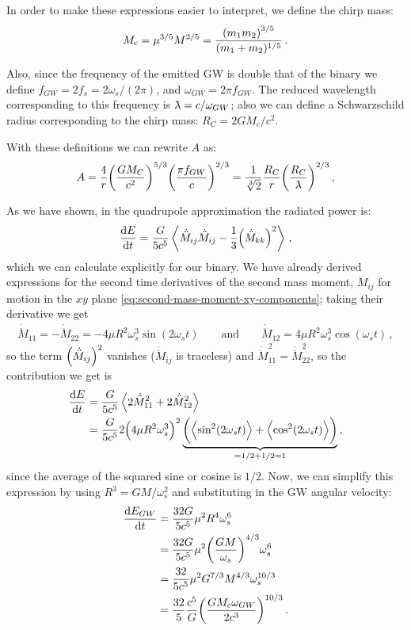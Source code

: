 \documentclass[main.tex]{subfiles}
\begin{document}
In order to make these expressions easier to interpret, we define the chirp mass: 
%
\begin{align}
M_c = \mu ^{3/5} M^{2/5} = \frac{\qty(m_1 m_2 )^{3/5}}{(m_1 + m_2 )^{1/5}}
\,.
\end{align}

Also, since the frequency of the emitted GW is double that of the binary we define \(f_{GW} = 2 f_s = 2 \omega_{s} / (2 \pi )\), and \(\omega_{GW} = 2 \pi f_{GW}\).
The reduced wavelength corresponding to this frequency is \(\lambdabar = c / \omega_{GW}\); also we can define a Schwarzschild radius corresponding to the chirp mass: \(R_C = 2GM_c / c^2\). 

With these definitions we can rewrite \(A\) as: 
%
\begin{align}
A = \frac{4}{r} \qty( \frac{G M_C}{c^2})^{5/3} \qty( \frac{\pi f_{GW}}{c})^{2/3}
= \frac{1}{\sqrt[3]{2}} \frac{R_C}{r} \qty( \frac{R_C}{\lambdabar})^{2/3}
\,,
\end{align}

As we have shown, in the quadrupole approximation the radiated power is: 
%
\begin{align}
\dv{E}{t} = \frac{G}{5 c^{5}} \expval{\dot{\ddot{M}}_{ij} \dot{\ddot{M}}_{ij} - \frac{1}{3} \qty(\dot{\ddot{M}}_{kk})^2}
\,,
\end{align}
%
which we can calculate explicitly for our binary.
We have already derived expressions for the second time derivatives of the second mass moment, \(\ddot{M}_{ij}\) for motion in the \(xy\) plane \eqref{eq:second-mass-moment-xy-components}; taking their derivative we get 
%
\begin{align}
\dot{\ddot{M}}_{11} = - \dot{\ddot{M}}_{22} = 
- 4 \mu R^2 \omega_{s}^3 \sin(2 \omega_{s}t )
\qquad \text{and} \qquad
\dot{\ddot{M}}_{12} = 4 \mu R^2 \omega_{s}^3 \cos(\omega_{s}t)
\,,
\end{align}
%
so the term \(\qty(\dot{\ddot{M}}_{ij})^2\) vanishes (\(\dot{\ddot{M}}_{ij}\) is traceless) and \(\dot{\ddot{M}}_{11}^2 = \dot{\ddot{M}}_{22}^2\), so the contribution we get is 
%
\begin{align}
\dv{E}{t} &= \frac{G}{5 c^{5}} \expval{2 \dot{\ddot{M}}_{11}^2 + 2 \dot{\ddot{M}}_{12}^2 }  \\
&= \frac{G}{5 c^{5}} 2 \qty(4 \mu R^2 \omega_{s}^3)^2 \underbrace{\qty(\expval{\sin^2(2 \omega_{s}t)} + \expval{\cos^2(2\omega_{s}t)})}_{= 1/2 + 1/2 = 1}
\,,
\end{align}
%
since the average of the squared sine or cosine is \(1/2\). 
Now, we can simplify this expression by using \(R^3 = GM / \omega_{s}^2\) and substituting in the GW angular velocity:
%
\begin{align}
\dv{E_{GW}}{t} &= \frac{32G}{5c^{5}} \mu^2 R^{4} \omega_{s}^{6}  \\
&= \frac{32G}{5c^{5}} \mu^2 \qty( \frac{GM}{\omega_{s}})^{4/3} \omega_{s}^{6}  \\
&= \frac{32}{5c^{5}} \mu^2 G^{7/3} M^{4/3} \omega_{s}^{10/3} \\
&= \frac{32}{5} \frac{c^{5}}{G} \qty( \frac{G M_c \omega_{GW}}{2 c^{3}})^{10/3} \label{eq:gravitational-wave-total-power-emitted}
\,.
\end{align}
\end{document}
